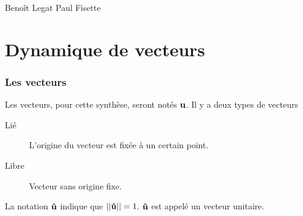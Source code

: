 

\usepackage{tensor}
\usepackage{bm}

\newtheorem{defin}{Definition}[section]
\newtheorem{nota}[defin]{Notation}
\newtheorem{prop}[defin]{Propriete}

\newcommand\dist{\mathrm{dist}}
\newcommand\Ker{\mathrm{Ker}}
\newcommand\fv[1]{{\bf #1}} %
\newcommand\fvd[1]{\dot{\bf #1}} %
\newcommand\fvdd[1]{\ddot{\bf #1}} %
\newcommand\fvr[1]{\mathring{\bf #1}} %
\newcommand\fvrr[1]{\overset{\circ\circ}{\bf #1}} %
\newcommand\uv[1]{{\bf\hat{ #1}}} %
\newcommand\ui{{\bf\hat{I}}} %
\newcommand\uj{{\bf\hat{J}}} %
\newcommand\uk{{\bf\hat{K}}} %
\newcommand\wrt[2]{\ensuremath{\tensor*[_{ #1}]{ #2}{}}} %
\newcommand\wtr[3]{\ensuremath{\tensor*[_{ #1}]{ #2}{^{ #3}}}} %
\newcommand\omegaf{{\bm \omega}}
\newcommand\omegafr{\mathring{\bm \omega}}
\newcommand\omegafd{\dot{\bm \omega}}
\newcommand\omegaft{\tilde{\bm \omega}}
\newcommand\omegaftr{\mathring{\tilde{\bm \omega}}}
\newcommand\omegat{\tilde{\omega}}
\newcommand\omegatd{\tilde{\dot{\omega}}}
\newcommand\ine{{\bf I}}
\newcommand\st{{\bf L}}
\newcommand\pst{{\bf M}}
\newcommand\lm{{\bf N}}
\newcommand\am{{\bf H}}
\newcommand\amd{\dot{\am}}
\newcommand\fo{{\bf F}}
\newcommand\po{\mathcal{P}}
\newcommand\xg{\ensuremath{\fv{R}}}
\newcommand\xgd{\ensuremath{\fvd{R}}}
\newcommand\xgdd{\ensuremath{\fvdd{R}}}
\newcommand\dvec[1]{\dot{\vec{ #1}}}
\newcommand\ddvec[1]{\ddot{\vec{ #1}}}
\newcommand\qp{\dot{q}}
\newcommand\dqp{\Delta \dot{q}}

{Beno\^it Legat}
{Paul Fisette}

\part{Dynamique de vecteurs}
\section{Les vecteurs}
Les vecteurs, pour cette synthèse, seront notés $\fv{u}$.
Il y a deux types de vecteurs
\begin{description}
  \item[Lié] L'origine du vecteur est fixée à un certain point.
  \item[Libre] Vecteur sans origine fixe.
\end{description}
La notation $\uv{u}$ indique que $||\uv{u}|| = 1$.
$\uv{u}$ est appelé un vecteur unitaire.

